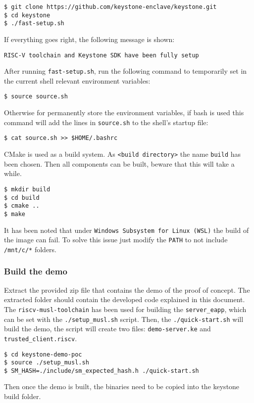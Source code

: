 \begin{lstlisting}[frame=single]
$ git clone https://github.com/keystone-enclave/keystone.git
$ cd keystone
$ ./fast-setup.sh
\end{lstlisting}
If everything goes right, the following message is shown: 

\begin{lstlisting}[frame=single]
    RISC-V toolchain and Keystone SDK have been fully setup
\end{lstlisting}
After running \texttt{fast-setup.sh}, run the following command to temporarily set in the current shell relevant environment variables: 
\begin{lstlisting}[frame=single]
$ source source.sh
\end{lstlisting}
Otherwise for permanently store the environment variables, if bash is used this command will add the lines in \texttt{source.sh} to the shell's startup file: 
\begin{lstlisting}[frame=single]
$ cat source.sh >> $HOME/.bashrc
\end{lstlisting}
CMake \cite{cmake} is used as a build system. As \texttt{<build directory>} the name \texttt{build} has been chosen. Then all components can be built, beware that this will take a while. 
\begin{lstlisting}[frame=single]
$ mkdir build
$ cd build
$ cmake ..
$ make
\end{lstlisting}
\begin{mybox}
\faExclamation\enspace It has been noted that under \texttt{Windows Subsystem for Linux (WSL)} the build of the image can fail. To solve this issue just modify the \texttt{PATH} to not include \texttt{/mnt/c/*} folders.
\end{mybox}

\subsubsection{Build the demo}
Extract the provided zip file that contains the demo of the proof of concept. The extracted folder should contain the developed code explained in this document. The \texttt{riscv-musl-toolchain} has been used for building the \texttt{server\_eapp}, which can be set with the \texttt{./setup\_musl.sh} script. Then, the \texttt{./quick-start.sh} will build the demo, the script will create two files: \texttt{demo-server.ke} and \texttt{trusted\_client.riscv}. 
\begin{lstlisting}[frame=single]
$ cd keystone-demo-poc
$ source ./setup_musl.sh
$ SM_HASH=./include/sm_expected_hash.h ./quick-start.sh
\end{lstlisting}
Then once the demo is built, the binaries need to be copied into the keystone build folder.


